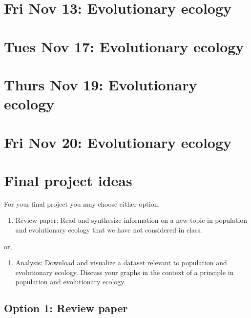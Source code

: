 \documentclass[]{book}
\providecommand{\tightlist}{%
  \setlength{\itemsep}{0pt}\setlength{\parskip}{0pt}}
\begin{document}
\chapter{Fri Nov 13: Evolutionary
ecology}\label{fri-nov-13-evolutionary-ecology}

\chapter{Tues Nov 17: Evolutionary
ecology}\label{tues-nov-17-evolutionary-ecology}

\chapter{Thurs Nov 19: Evolutionary
ecology}\label{thurs-nov-19-evolutionary-ecology}

\chapter{Fri Nov 20: Evolutionary
ecology}\label{fri-nov-20-evolutionary-ecology}

\chapter{Final project ideas}\label{final-project-ideas}

For your final project you may choose either option:

\begin{enumerate}
\def\labelenumi{\arabic{enumi}.}
\tightlist
\item
  Review paper: Read and synthesize information on a new topic in
  population and evolutionary ecology that we have not considered in
  class.
\end{enumerate}

or,

\begin{enumerate}
\def\labelenumi{\arabic{enumi}.}
\setcounter{enumi}{1}
\tightlist
\item
  Analysis: Download and visualize a dataset relevant to population and
  evolutionary ecology. Discuss your graphs in the context of a
  principle in population and evolutionary ecology.
\end{enumerate}

\section{Option 1: Review paper}\label{option-1-review-paper}
\end{document}
